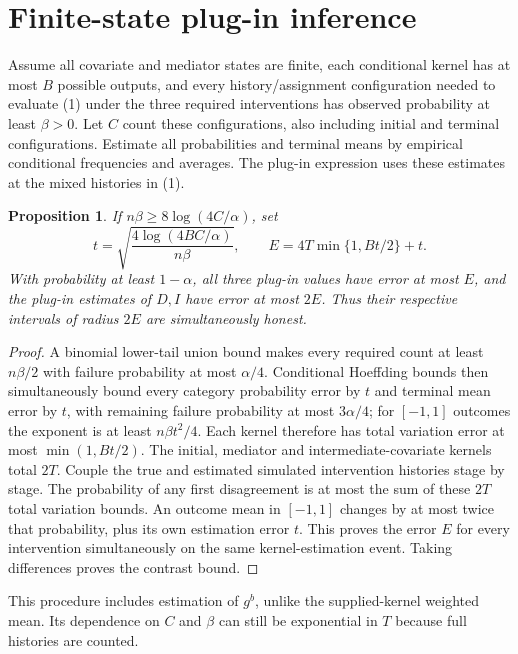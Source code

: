 \documentclass[11pt]{article}
\newtheorem{proposition}[theorem]{Proposition}
\theoremstyle{definition}
\begin{document}
\section*{Finite-state plug-in inference}
Assume all covariate and mediator states are finite, each conditional
kernel has at most $B$ possible outputs, and every history/assignment
configuration needed to evaluate (1) under the three required interventions
has observed probability at least $\beta>0$. Let $C$ count these
configurations, also including initial and terminal configurations.
Estimate all probabilities and terminal means by empirical conditional
frequencies and averages. The plug-in expression uses these estimates
at the mixed histories in (1).
\begin{proposition}
If $n\beta\ge8\log(4C/\alpha)$, set
\[
 t=\sqrt{\frac{4\log(4BC/\alpha)}{n\beta}},\qquad
 E=4T\min\{1,Bt/2\}+t.
\]
With probability at least $1-\alpha$, all three plug-in values have error
at most $E$, and the plug-in estimates of $D,I$ have error at most $2E$.
Thus their respective intervals of radius $2E$ are simultaneously honest.
\end{proposition}
\begin{proof}
A binomial lower-tail union bound makes every required count at least
$n\beta/2$ with failure probability at most $\alpha/4$.
Conditional Hoeffding bounds then simultaneously bound every category
probability error by $t$ and terminal mean error by $t$, with remaining
failure probability at most $3\alpha/4$; for $[-1,1]$ outcomes the exponent
is at least $n\beta t^2/4$. Each kernel therefore has total variation
error at most $\min(1,Bt/2)$.
The initial, mediator and intermediate-covariate kernels total $2T$.
Couple the true and estimated simulated intervention histories stage by
stage. The probability of any first disagreement is at most the sum of
these $2T$ total variation bounds. An outcome mean in $[-1,1]$ changes
by at most twice that probability, plus its own estimation error $t$.
This proves the error $E$ for every intervention simultaneously on the
same kernel-estimation event. Taking differences proves the contrast bound.
\end{proof}
This procedure includes estimation of $g^b$, unlike the supplied-kernel
weighted mean. Its dependence on $C$ and $\beta$ can still be exponential
in $T$ because full histories are counted.
\end{document}
